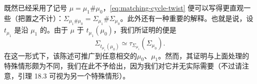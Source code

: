 \begin{remark}\label{thm:matching-half-sum-remark}
既然已经采用了记号 $\mu=\mu_1\#\mu_0$，\eqref{eq:matching-cycle-twist} 便可以写得更直观一些（把\trHomotopy{}置之不计）：$\Sigma_{\mu_1\#\mu_0}=\Sigma_{\mu_1}\#\Sigma_{\mu_0}$。此外还有一种重要的解释。也就是说，设 $t_{\mu_1}$ 是沿 $\mu_1$ 的\trHalfTwist。由于 $\mu$ \trIsotopy{}于 $t_{\mu_1}(\mu_0)$，我们所证明的便是
\begin{equation*}
\Sigma_{t_{\mu_1}(\mu_0)}\simeq\tau_{\Sigma_{\mu_1}}(\Sigma_{\mu_0}).
\end{equation*}
在这一形式下，该陈述可推广到任意相交的\trMatchingPath{}$\mu_0$、$\mu_1$。然而，其证明与上面处理的特殊情形颇为不同，我们在此不予给出，因为我们对它并无实际需要（不过请注意，引理 18.3 可视为另一个特殊情形）。
\end{remark}
